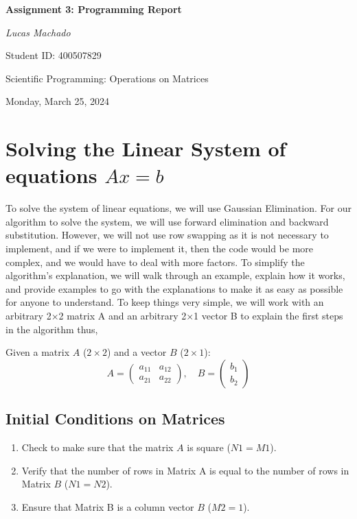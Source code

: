 \documentclass[a4paper]{article}
\begin{document}
\begin{titlepage}
    \centering
    \vspace*{\fill} 
    {\Large\bfseries Assignment 3: Programming Report \par}
    \vspace{1.5cm} 
    {\large\itshape Lucas Machado \par} 
    \vspace{0.5cm} 
    {\large Student ID: 400507829 \par}
    \vspace{1.5cm} 
    {\large Scientific Programming: Operations on Matrices \par}
    \vspace{1cm} 
    {\large Monday, March 25, 2024 \par} 
    \vspace*{\fill} 
\end{titlepage}



\section{Solving the Linear System of equations $Ax = b$}
To solve the system of linear equations, we will use  Gaussian Elimination. For our algorithm to solve the system, we will use forward elimination and backward substitution. However, we will not use row swapping as it is not necessary to implement, and if we were to implement it, then the code would be more complex, and we would have to deal with more factors. To simplify the algorithm's explanation, we will walk through an example, explain how it works, and provide examples to go with the explanations to make it as easy as possible for anyone to understand. To keep things very simple, we will work with an arbitrary 2×2 matrix A and an arbitrary 2×1 vector B to explain the first steps in the algorithm thus, 

Given a matrix $A$ ($2 \times 2$) and a vector $B$ ($2 \times 1$):
\[
A = \begin{pmatrix}
a_{11} & a_{12} \\
a_{21} & a_{22}
\end{pmatrix}, \quad B = \begin{pmatrix}
b_{1} \\
b_{2}
\end{pmatrix}
\]

\subsection{Initial Conditions on Matrices}
\begin{enumerate}
    \item Check to make sure that the matrix $A$ is square ($N1 = M1$).
    \item Verify that the number of rows in Matrix A is equal to the number of rows in Matrix $B$ ($N1 = N2$).
    \item Ensure that Matrix B is a column vector $B$ ($M2 = 1$).
\end{enumerate}
\end{document}
